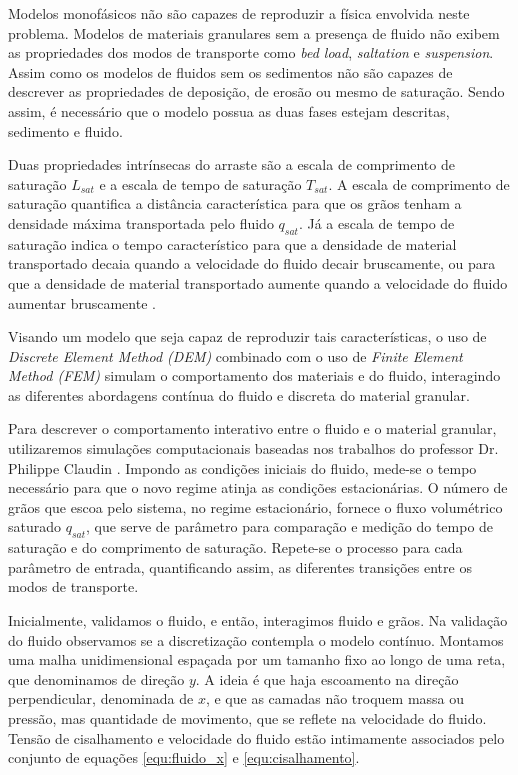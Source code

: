     Modelos monofásicos não são capazes de reproduzir a física envolvida neste problema. Modelos de materiais granulares sem a presença de fluido não exibem as propriedades dos modos de transporte como \textit{bed load}, \textit{saltation} e \textit{suspension}. Assim como os modelos de fluidos sem os sedimentos não são capazes de descrever as propriedades de deposição, de erosão ou mesmo de saturação. Sendo assim, é necessário que o modelo possua as duas fases estejam descritas, sedimento e fluido.

    Duas propriedades intrínsecas do arraste são a escala de comprimento de saturação $L_{sat}$ e a escala de tempo de saturação $T_{sat}$. A escala de comprimento de saturação quantifica a distância característica para que os grãos tenham a densidade máxima transportada pelo fluido $q_{sat}$. Já a escala de tempo de saturação indica o tempo característico para que a densidade de material transportado decaia quando a velocidade do fluido decair bruscamente, ou para que a densidade de material transportado aumente quando a velocidade do fluido aumentar bruscamente \cite{Granular_Media_Between_Fluid_and_Solid}.


    Visando um modelo que seja capaz de reproduzir tais características, o uso de \textit{Discrete Element Method (DEM)} combinado com o uso de \textit{Finite Element Method (FEM)} simulam o comportamento dos materiais e do fluido, interagindo as diferentes abordagens contínua do fluido e discreta do material granular.

    Para descrever o comportamento interativo entre o fluido e o material granular, utilizaremos simulações computacionais baseadas nos trabalhos do professor Dr. Philippe Claudin \cite{Numerical_simulation_of_turbulent_sediment_transport, Sand_ripples_and_dunes, Direct_numerical_simulations_of_aeolian_sand_ripples}. Impondo as condições iniciais do fluido, mede-se o tempo necessário para que o novo regime atinja as condições estacionárias. O número de grãos que escoa pelo sistema, no regime estacionário, fornece o fluxo volumétrico saturado $q_{sat}$, que serve de parâmetro para comparação e medição do tempo de saturação e do comprimento de saturação. Repete-se o processo para cada parâmetro de entrada, quantificando assim, as diferentes transições entre os modos de transporte.

    Inicialmente, validamos o fluido, e então, interagimos fluido e grãos. Na validação do fluido observamos se a discretização contempla o modelo contínuo. Montamos uma malha unidimensional espaçada por um tamanho fixo ao longo de uma reta, que denominamos de direção $y$. A ideia é que haja escoamento na direção perpendicular, denominada de $x$, e que as camadas não troquem massa ou pressão, mas quantidade de movimento, que se reflete na velocidade do fluido. Tensão de cisalhamento e velocidade do fluido estão intimamente associados pelo conjunto de equações \ref{equ:fluido_x} e \ref{equ:cisalhamento}.


